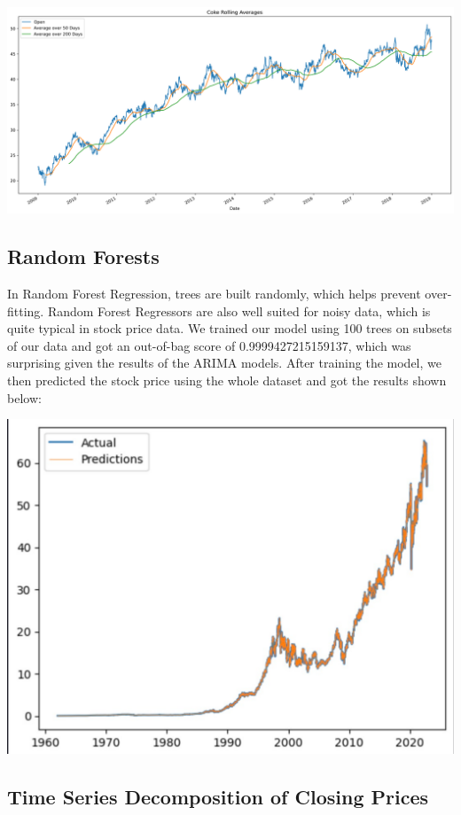 \documentclass[12pt]{article}
\begin{document}
\includegraphics[width=\textwidth]{../images/rolling_average.pdf}

\subsection{Random Forests}
In Random Forest Regression, trees are built randomly, which helps prevent over-fitting. Random Forest Regressors are also well 
suited for noisy data, which is quite typical in stock price data. We trained our model using 100 trees on subsets of our data 
and got an out-of-bag score of 0.9999427215159137, which was surprising given the results of the ARIMA models. After training the 
model, we then predicted the stock price using the whole dataset and got the results shown below:

\includegraphics[width=\textwidth]{../images/random_forest_regressor.pdf}


\subsection{Time Series Decomposition of Closing Prices}
\end{document}
